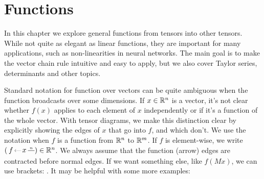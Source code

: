 

\chapter{Functions}\label{chapter:functions}


In this chapter we explore general functions from tensors into other tensors.
While not quite as elegant as linear functions, they are important for many applications, such as non-linearities in neural networks.
The main goal is to make the vector chain rule intuitive and easy to apply, but we also cover Taylor series, determinants and other topics.

Standard notation for function over vectors can be quite ambiguous when the function broadcasts over some dimensions.
If $x\in\mathbb R^n$ is a vector, it's not clear whether $f(x)$ applies to each element of $x$ independently or if it's a function of the whole vector.
With tensor diagrams, we make this distinction clear by explicitly showing the edges of $x$ that go into $f$, and which don't.
We use the notation 
when $f$ is a function from $\mathbb R^n$ to $\mathbb R^m$.
If $f$ is element-wise, we write
$(\tikz[baseline=-.25em, inner sep=2pt]{
   \draw[->, densely dotted] (.3,0) node[right](x){$x$} -- (0,0) node(f)[left]{$f$};
   \draw (x) -- ++(.5,0) node[midway, above, font=\tiny] {$n$};
}) \in \R^n$.
We always assume that the function (arrow) edges are contracted before normal edges.
If we want something else, like $f(Mx)$, we can use brackets:
.
It may be helpful with some more examples:
\vspace{-1.5em}

